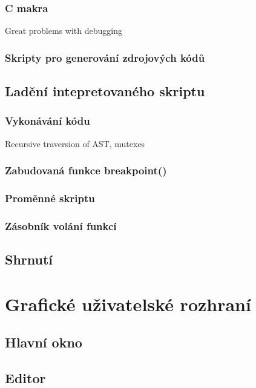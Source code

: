 \documentclass[11pt,twoside,a4paper]{book}
\begin{document}
\subsubsection{C makra}
Great problems with debugging

\subsubsection{Skripty pro generování zdrojových kódů}


\subsection{Ladění intepretovaného skriptu}

\subsubsection{Vykonávání kódu}

Recursive traversion of AST, mutexes


\subsubsection{Zabudovaná funkce breakpoint()}

\subsubsection{Proměnné skriptu}

\subsubsection{Zásobník volání funkcí}


\subsection{Shrnutí}



\section{Grafické uživatelské rozhraní}

\subsection{Hlavní okno}

\subsection{Editor}
\end{document}
